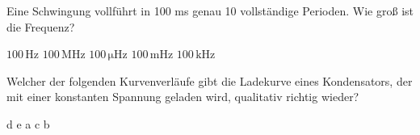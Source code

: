 \documentclass[11pt]{exam}
\begin{document}
\begin{questions}
\vspace{3mm}\question Eine Schwingung vollführt in 100 ms genau 10 vollständige Perioden. Wie groß ist die Frequenz?

\begin{choices}
	\choice \(\mathrm{100\,Hz}\)
	\choice \(\mathrm{100\,MHz}\)
	\choice \(\mathrm{100\,\mu Hz}\)
	\choice \(\mathrm{100\,mHz}\)
	\choice \(\mathrm{100\,kHz}\)
\end{choices}

\vspace{3mm}\question Welcher der folgenden Kurvenverläufe gibt die Ladekurve eines Kondensators, der mit einer konstanten Spannung geladen wird, qualitativ richtig wieder?

\begin{choices}
	\choice d
	\choice e
	\choice a
	\choice c
	\choice b
\end{choices}

\vspace{3mm}\end{questions}
\end{document}
